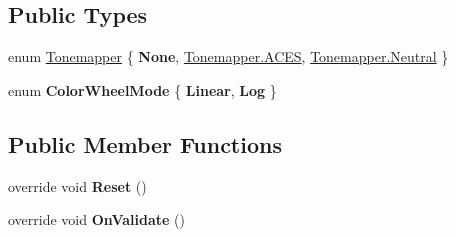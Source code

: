 \subsection*{Public Types}
\begin{DoxyCompactItemize}
\item 
enum \hyperlink{class_unity_engine_1_1_post_processing_1_1_color_grading_model_a4955bb9dfed7e27c93e7493ff66f3de6}{Tonemapper} \{ {\bfseries None}, 
\hyperlink{class_unity_engine_1_1_post_processing_1_1_color_grading_model_a4955bb9dfed7e27c93e7493ff66f3de6a01ec90d9624dce53f3f3492882841fe6}{Tonemapper.\+A\+C\+ES}, 
\hyperlink{class_unity_engine_1_1_post_processing_1_1_color_grading_model_a4955bb9dfed7e27c93e7493ff66f3de6ae9bb5320b3890b6747c91b5a71ae5a01}{Tonemapper.\+Neutral}
 \}
\item 
\mbox{\label{class_unity_engine_1_1_post_processing_1_1_color_grading_model_a57da7f62b07b7109f15758571a852586}} 
enum {\bfseries Color\+Wheel\+Mode} \{ {\bfseries Linear}, 
{\bfseries Log}
 \}
\end{DoxyCompactItemize}
\subsection*{Public Member Functions}
\begin{DoxyCompactItemize}
\item 
\mbox{\label{class_unity_engine_1_1_post_processing_1_1_color_grading_model_a64a6bc1783ee8f2f66e4eb6c13385eed}} 
override void {\bfseries Reset} ()
\item 
\mbox{\label{class_unity_engine_1_1_post_processing_1_1_color_grading_model_a2cdf5183a4882e9ae3439b22fe935f12}} 
override void {\bfseries On\+Validate} ()
\end{DoxyCompactItemize}
